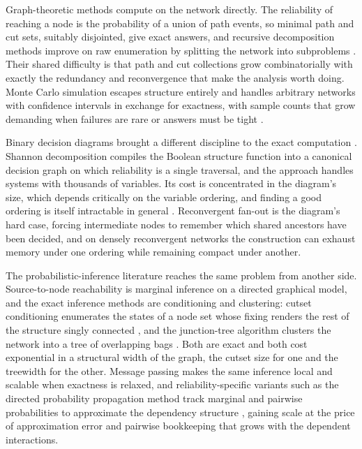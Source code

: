 \documentclass[12pt]{report}
\begin{document}
Graph-theoretic methods compute on the network directly. The reliability of reaching a node is the probability of a union of path events, so minimal path and cut sets, suitably disjointed, give exact answers, and recursive decomposition methods improve on raw enumeration by splitting the network into subproblems \cite{liu2012improved,kim2013network}. Their shared difficulty is that path and cut collections grow combinatorially with exactly the redundancy and reconvergence that make the analysis worth doing. Monte Carlo simulation escapes structure entirely and handles arbitrary networks with confidence intervals in exchange for exactness, with sample counts that grow demanding when failures are rare or answers must be tight \cite{fishman1986comparison}.

Binary decision diagrams brought a different discipline to the exact computation \cite{bryant1986graph,rauzy1993new}. Shannon decomposition compiles the Boolean structure function into a canonical decision graph on which reliability is a single traversal, and the approach handles systems with thousands of variables. Its cost is concentrated in the diagram's size, which depends critically on the variable ordering, and finding a good ordering is itself intractable in general \cite{bryant2002ordered}. Reconvergent fan-out is the diagram's hard case, forcing intermediate nodes to remember which shared ancestors have been decided, and on densely reconvergent networks the construction can exhaust memory under one ordering while remaining compact under another.

The probabilistic-inference literature reaches the same problem from another side. Source-to-node reachability is marginal inference on a directed graphical model, and the exact inference methods are conditioning and clustering: cutset conditioning enumerates the states of a node set whose fixing renders the rest of the structure singly connected \cite{pearl1988probabilistic}, and the junction-tree algorithm clusters the network into a tree of overlapping bags \cite{lauritzen1988local}. Both are exact and both cost exponential in a structural width of the graph, the cutset size for one and the treewidth for the other. Message passing makes the same inference local and scalable when exactness is relaxed, and reliability-specific variants such as the directed probability propagation method track marginal and pairwise probabilities to approximate the dependency structure \cite{tong2019probability}, gaining scale at the price of approximation error and pairwise bookkeeping that grows with the dependent interactions.
\end{document}
